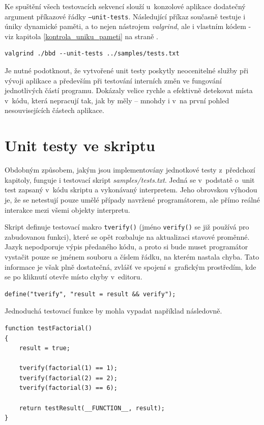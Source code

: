 \documentclass[11pt,twoside,a4paper]{book}
\begin{document}
Ke spuštění všech testovacích sekvencí slouží u~konzolové aplikace dodatečný argument pří\-ka\-zo\-vé řádky \texttt{--unit-tests}. Následující příkaz současně testuje i úniky dynamické paměti, a to nejen nástrojem \textit{valgrind}, ale i vlastním kódem - viz kapitola \ref{kontrola_uniku_pameti} na straně \pageref{kontrola_uniku_pameti}.

\begin{verbatim}
valgrind ./bbd --unit-tests ../samples/tests.txt
\end{verbatim}

Je nutné podotknout, že vytvořené unit testy poskytly neocenitelné služby při vývoji aplikace a především při testování interních změn ve fungování jednotlivých částí programu. Dokázaly velice rychle a efektivně detekovat místa v~kódu, která nepracují tak, jak by měly -- mnohdy i v~na první pohled nesouvisejících částech aplikace.


\section{Unit testy ve skriptu}

Obdobným způsobem, jakým jsou implementovány jednotkové testy z~předchozí kapitoly, funguje i testovací skript \textit{samples/tests.txt}. Jedná se v~podstatě o~unit test zapsaný v~kódu skriptu a vykonávaný interpretem. Jeho obrovskou výhodou je, že se netestují pouze umělé případy navržené programátorem, ale přímo reálné interakce mezi všemi objekty interpretu.

Skript definuje testovací makro \texttt{tverify()} (jméno \texttt{verify()} se již používá pro zabudovanou funkci), které se opět rozbaluje na aktualizaci stavové proměnné. Jazyk nepodporuje výpis předaného kódu, a proto si bude muset programátor vystačit pouze se jménem souboru a číslem řádku, na kterém nastala chyba. Tato informace je však plně dostatečná, zvlášť ve spojení s~grafickým prostředím, kde se po kliknutí otevře místo chyby v~editoru.

\begin{verbatim}
define("tverify", "result = result && verify");
\end{verbatim}

Jednoduchá testovací funkce by mohla vypadat například následovně.

\begin{verbatim}
function testFactorial()
{
    result = true;

    tverify(factorial(1) == 1);
    tverify(factorial(2) == 2);
    tverify(factorial(3) == 6);

    return testResult(__FUNCTION__, result);
}
\end{verbatim}
\end{document}
